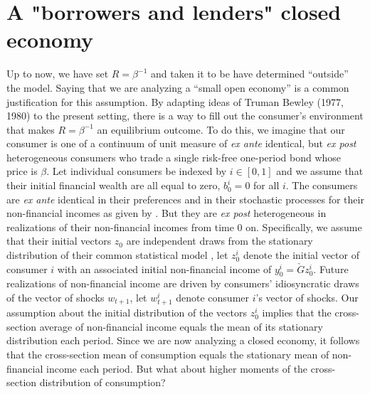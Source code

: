 \section{A "borrowers and lenders" closed economy}\label{sec:borrowlender}%
Up to now, we have set $R = \beta^{-1}$  and  taken it to be have  
determined ``outside'' the model.  Saying that we are analyzing a ``small open economy''  is a common justification  for this assumption.
%
By adapting ideas of   Truman Bewley (1977, 1980) to the present  setting, there is a way to fill out 
the  consumer's environment  that makes  $R = \beta^{-1}$ an equilibrium outcome.  
To do this, we imagine that our consumer is one of a  continuum of unit measure of {\it ex ante} identical, but {\it ex post} 
heterogeneous consumers who trade a single risk-free one-period 
bond whose price is $\beta$.  
Let individual consumers be indexed by $i\in [0,1]$ and we
assume that their initial financial wealth are all equal to
zero, $b^i_0 = 0$ for all $i$. 
The consumers are {\it ex ante} identical in their preferences and in their stochastic processes for 
their non-financial incomes as given by .
But they are {\it ex post} heterogeneous in  realizations of their non-financial incomes from time $0$ on. 
Specifically, we assume that their initial
vectors $z_0$ are independent draws from the stationary distribution  of their common statistical model ,
let $z^i_0$ denote the initial vector of consumer $i$ with
an associated initial non-financial income of 
$y^i_0 = \check G  z^i_0$. 
Future realizations of non-financial income are driven by
consumers' idiosyncratic draws of the vector of shocks 
$w_{t+1}$, let $w^i_{t+1}$ denote consumer $i$'s vector 
of shocks.
Our assumption about the initial distribution of 
the vectors $z^i_0$ implies that the cross-section average of non-financial income equals the mean of its  stationary distribution each period.   
Since we are now analyzing a closed economy, it follows that the cross-section mean of consumption equals the stationary mean of non-financial income each period. 
But what about higher moments of the cross-section distribution of consumption? 


